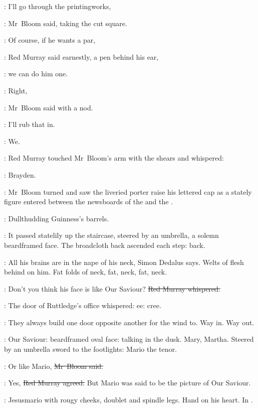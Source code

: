 \Bloom:
I'll go through the printingworks,

:
Mr~Bloom said,
taking the cut square.

\redmurray:
Of course, if he wants a par,

:
Red Murray said earnestly, a pen behind his ear,

\redmurray:
we can do him one.

\Bloom:
Right,

:
Mr~Bloom said with a nod.

\Bloom:
I'll rub that in.

\BloomInt:
We.



:
Red Murray touched Mr~Bloom's arm with the shears and whispered:

\redmurray:
Brayden.

:
Mr~Bloom turned and saw the liveried porter raise his lettered cap
as a stately figure entered between the newsboards
of the 
and the .

:
Dullthudding Guinness's barrels.

:
It passed statelily up the staircase,
steered by an umbrella,
a solemn beardframed face.
The broadcloth back ascended each step: back.

\BloomInt:
All his brains are in the nape of his neck, Simon Dedalus says.
Welts of flesh behind on him.
Fat folds of neck, fat, neck, fat, neck.

\redmurray:
Don't you think his face is like Our Saviour?
\sout{Red Murray whispered.}

:
The door of Ruttledge's office whispered:
ee:
cree.

\BloomInt:
They always build one door opposite another for the wind to.
Way in.
Way out.

\BloomInt:
Our Saviour:
beardframed oval face:
talking in the dusk.
Mary, Martha.
Steered by an umbrella sword to the footlights:
Mario the tenor.

\Bloom:
Or like Mario,
\sout{Mr~Bloom said.}

\redmurray:
Yes,
\sout{Red Murray agreed.}
But Mario was said to be the picture of Our Saviour.

\BloomInt:
Jesusmario with rougy cheeks, doublet and spindle legs.
Hand on his heart.
In .



